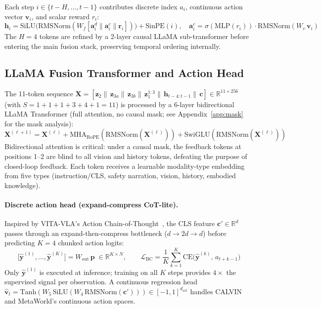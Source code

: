 \documentclass{article}
\begin{document}
Each step $i\in\{t{-}H,\ldots,t{-}1\}$ contributes discrete index $a_i$,
continuous action vector $\mathbf{v}_i$, and scalar reward $r_i$:
\begin{equation}
  \mathbf{h}_i = \mathrm{SiLU}\!\bigl(
    \mathrm{RMSNorm}(W_f[\mathbf{a}_i^{d}\|\mathbf{a}_i^{c}\|\mathbf{r}_i])
  \bigr) + \mathrm{SinPE}(i),
  \quad \mathbf{a}_i^{c} = \sigma(\mathrm{MLP}(r_i))\cdot\mathrm{RMSNorm}(W_v\,\mathbf{v}_i)
  \label{eq:hist_tok}
\end{equation}
The $H{=}4$ tokens are refined by a 2-layer causal LLaMA sub-transformer before
entering the main fusion stack, preserving temporal ordering internally.

\subsection{LLaMA Fusion Transformer and Action Head}

The 11-token sequence
$\mathbf{X} = [\mathbf{z}_2 \|\, \mathbf{z}_{3a} \|\, \mathbf{z}_{3b} \|\,
\mathbf{z}_1^{1:3} \|\, \mathbf{h}_{t-4:t-1} \|\, \mathbf{c}]\in\mathbb{R}^{11\times256}$
(with $S=1{+}1{+}1{+}3{+}4{+}1=11$) is processed by a 6-layer bidirectional
LLaMA Transformer (full attention, no causal mask; see Appendix~\ref{app:mask}
for the mask analysis):
\begin{equation}
  \mathbf{X}^{(\ell+1)}
  = \mathbf{X}^{(\ell)}
  + \mathrm{MHA}_{\mathrm{RoPE}}\!\left(\mathrm{RMSNorm}(\mathbf{X}^{(\ell)})\right)
  + \mathrm{SwiGLU}\!\left(\mathrm{RMSNorm}(\mathbf{X}^{(\ell)})\right)
  \label{eq:llama}
\end{equation}
Bidirectional attention is critical: under a causal mask, the feedback tokens
at positions 1--2 are blind to all vision and history tokens, defeating the
purpose of closed-loop feedback.
Each token receives a learnable modality-type embedding~\citep{kim2021vilt} from
five types (instruction/CLS, safety narration, vision, history, embodied
knowledge).

\paragraph{Discrete action head (expand-compress CoT-lite).}
Inspired by VITA-VLA's Action Chain-of-Thought~\citep{vitavla2024}, the CLS
feature $\mathbf{c}'\!\in\!\mathbb{R}^d$ passes through an expand-then-compress
bottleneck ($d \to 2d \to d$) before predicting $K{=}4$ chunked action logits:
\begin{equation}
  \bigl[\hat{\mathbf{y}}^{(1)},\ldots,\hat{\mathbf{y}}^{(K)}\bigr]
  = W_{\mathrm{out}}\,\mathbf{p} \;\in\mathbb{R}^{K\times N},
  \qquad
  \mathcal{L}_{\mathrm{BC}}
  = \frac{1}{K}\sum_{k=1}^{K}
    \mathrm{CE}\!\bigl(\hat{\mathbf{y}}^{(k)},\,a_{t+k-1}\bigr)
  \label{eq:chunk_ce}
\end{equation}
Only $\hat{\mathbf{y}}^{(1)}$ is executed at inference; training on all $K$
steps provides $4{\times}$ the supervised signal per observation.
A continuous regression head $\hat{\mathbf{v}}_t =
\mathrm{Tanh}(W_5\,\mathrm{SiLU}(W_4\,\mathrm{RMSNorm}(\mathbf{c}')))\in[-1,1]^{d_{\mathrm{act}}}$
handles CALVIN and MetaWorld's continuous action spaces.
\end{document}
